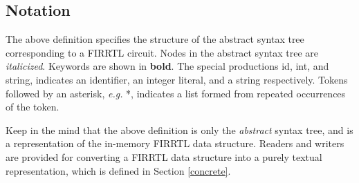 \documentclass[12pt]{article}
\begin{document}
\subsection{Notation}
The above definition specifies the structure of the abstract syntax tree corresponding to a FIRRTL circuit.
Nodes in the abstract syntax tree are {\em italicized}.
Keywords are shown in {\bf bold}.
The special productions id, int, and string, indicates an identifier, an integer literal, and a string respectively.
Tokens followed by an asterisk, {\em e.g.} *, indicates a list formed from repeated occurrences of the token.

Keep in the mind that the above definition is only the {\em abstract} syntax tree, and is a representation of the in-memory FIRRTL data structure.
Readers and writers are provided for converting a FIRRTL data structure into a purely textual representation, which is defined in Section \ref{concrete}.
\end{document}
